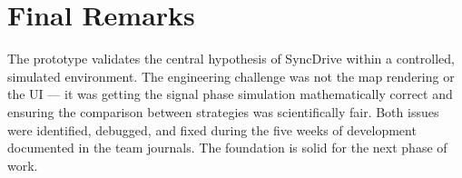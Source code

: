 \documentclass[12pt,a4paper]{report}
\begin{document}
\section{Final Remarks}

The prototype validates the central hypothesis of SyncDrive within a
controlled, simulated environment. The engineering challenge was not the
map rendering or the UI --- it was getting the signal phase simulation
mathematically correct and ensuring the comparison between strategies was
scientifically fair. Both issues were identified, debugged, and fixed during
the five weeks of development documented in the team journals. The foundation
is solid for the next phase of work.

\printbibliography
\end{document}
